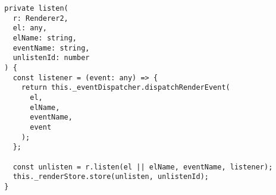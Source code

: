 \begin{verbatim}
  private listen(
    r: Renderer2,
    el: any,
    elName: string,
    eventName: string,
    unlistenId: number
  ) {
    const listener = (event: any) => {
      return this._eventDispatcher.dispatchRenderEvent(
        el,
        elName,
        eventName,
        event
      );
    };

    const unlisten = r.listen(el || elName, eventName, listener);
    this._renderStore.store(unlisten, unlistenId);
  }
\end{verbatim}

